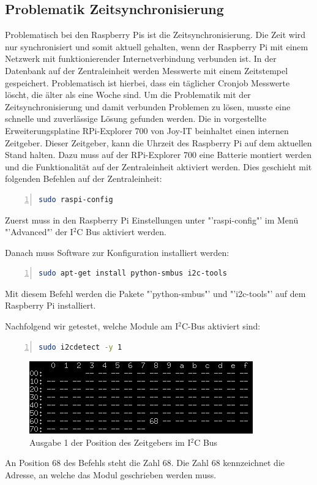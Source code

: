 \subsection{Problematik Zeitsynchronisierung}\label{Zeitsynchronisierung}
Problematisch bei den Raspberry Pis ist die Zeitsynchronisierung. Die Zeit wird nur synchronisiert und somit aktuell gehalten, wenn der Raspberry Pi mit einem Netzwerk mit funktionierender Internetverbindung verbunden ist. In der Datenbank auf der Zentraleinheit werden Messwerte mit einem Zeitstempel gespeichert. Problematisch ist hierbei, dass ein täglicher Cronjob Messwerte löscht, die älter als eine Woche sind. Um die Problematik mit der Zeitsynchronisierung und damit verbunden Problemen zu lösen, musste eine schnelle und zuverlässige Lösung gefunden werden. Die in  vorgestellte Erweiterungsplatine RPi-Explorer 700 von Joy-IT beinhaltet einen internen Zeitgeber. Dieser Zeitgeber, kann die Uhrzeit des Raspberry Pi auf dem aktuellen Stand halten. Dazu muss auf der RPi-Explorer 700 eine Batterie montiert werden und die Funktionalität auf der Zentraleinheit aktiviert werden. Dies geschieht mit folgenden Befehlen auf der Zentraleinheit:
\begin{lstlisting}[caption=Aktivieren des I$^2$C Bus,frame=single,numbers=left,language=bash,showstringspaces=false]
sudo raspi-config
\end{lstlisting}
Zuerst muss in den Raspberry Pi Einstellungen unter "'raspi-config"' im Menü "'Advanced"' der I$^2$C Bus aktiviert werden.

Danach muss Software zur Konfiguration installiert werden:
\begin{lstlisting}[caption=Installation für die Konfiguration,frame=single,numbers=left,language=bash,showstringspaces=false]
sudo apt-get install python-smbus i2c-tools
\end{lstlisting}
Mit diesem Befehl werden die Pakete "'python-smbus"' und "'i2c-tools"' auf dem Raspberry Pi installiert.

Nachfolgend wir getestet, welche Module am I$^2$C-Bus aktiviert sind:
\begin{lstlisting}[caption=I$^2$C-Bus,frame=single,numbers=left,language=bash,showstringspaces=false]
sudo i2cdetect -y 1
\end{lstlisting}
\begin{figure}[htp]
	\includegraphics[width=\textwidth]{Bilder/Kapitel4/1pos68.png}
	\caption[Ausgabe 1 der Position des Zeitgebers im I$^2$C Bus]{Ausgabe 1 der Position des Zeitgebers im I$^2$C Bus}
	\label{fig:Kapitel4/1pos68.png}
\end{figure}
An Position 68 des Befehls steht die Zahl 68. Die Zahl 68 kennzeichnet die Adresse, an welche das Modul geschrieben werden muss.

